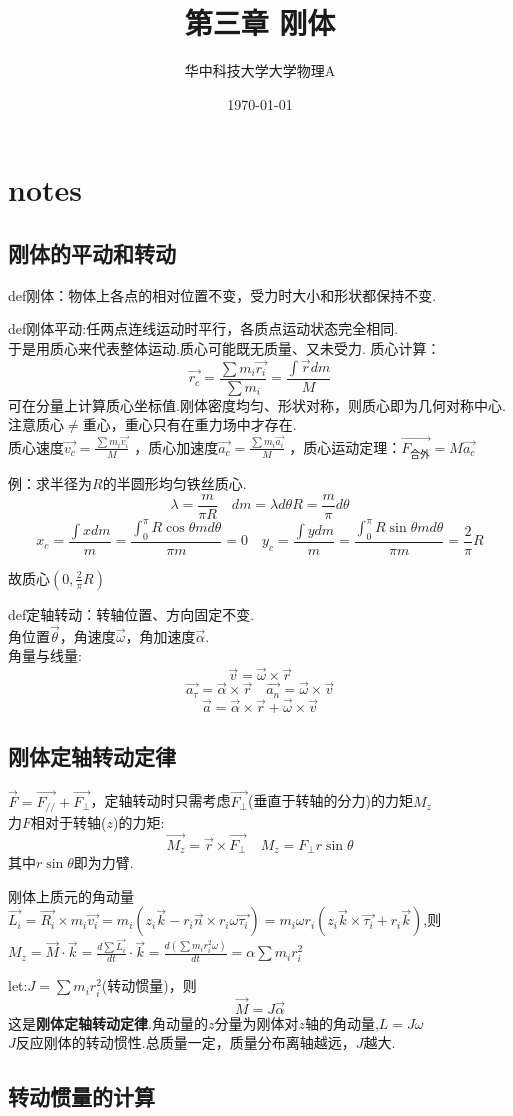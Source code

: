\documentclass[10pt,a4paper]{article}
\title{第三章 刚体}
\author{华中科技大学大学物理A}
\date{\today}
\begin{document}
\maketitle
\section{notes}
\subsection{刚体的平动和转动}
def刚体：物体上各点的相对位置不变，受力时大小和形状都保持不变.

def刚体平动:任两点连线运动时平行，各质点运动状态完全相同.
\\于是用质心来代表整体运动.质心可能既无质量、又未受力.
质心计算：
\[
\vec{r_c}=\frac{\sum m_i\vec{r_i}}{\sum m_i}
=\frac{\int\vec{r}dm}{M}
\]
可在分量上计算质心坐标值.刚体密度均匀、形状对称，则质心即为几何对称中心.
注意质心$\neq$重心，重心只有在重力场中才存在.
\\质心速度$\vec{v_c}=\frac{\sum m_i\vec{v_i}}{M}$
，质心加速度$\vec{a_c}=\frac{\sum m_i\vec{a_i}}{M}$
，质心运动定理：$\vec{F_\text{合外}}=M\vec{a_c}$

{\fontsize{8pt}{8pt}\selectfont
例：求半径为$R$的半圆形均匀铁丝质心.
\[\lambda=\frac{m}{\pi R}\quad dm=\lambda d\theta R=\frac{m}{\pi}d\theta
\]
\[x_c=\frac{\int xdm}{m}=\frac{\int_0^\pi R\cos\theta md\theta}{\pi m}=0
\quad y_c=\frac{\int ydm}{m}=\frac{\int_0^\pi R\sin\theta md\theta}{\pi m}=\frac{2}{\pi}R\]

故质心$(0,\frac{2}{\pi}R)$
}

def定轴转动：转轴位置、方向固定不变.\\
角位置$\vec{\theta}$，角速度$\vec{\omega}$，角加速度$\vec{\alpha}$.\\
角量与线量:
\[\vec{v}=\vec{\omega}\times\vec{r}\]
\[\boxed{\vec{a_{\tau}}=\vec{\alpha}\times\vec{r}}\quad\vec{a_n}=\vec{\omega}\times\vec{v}\]
\[\vec{a}=\vec{\alpha}\times\vec{r}+\vec{\omega}\times\vec{v}\]
\subsection{刚体定轴转动定律}
$\vec{F}=\vec{F_{//}}+\vec{F_\perp}$，定轴转动时只需考虑$\vec{F_{\perp}}$(垂直于转轴的分力)的力矩$M_z$
\\力$F$相对于转轴($z$)的力矩:
\[\vec{M_z}=\vec{r}\times\vec{F_\perp}\quad M_z=F_\perp r\sin\theta\]
其中$r\sin\theta$即为力臂.

{
\fontsize{8pt}{8pt}\selectfont
刚体上质元的角动量$\vec{L_i}=\vec{R_i}\times m_i\vec{v_i}=m_i(z_i\vec{k}-r_i\vec{n}\times r_i\omega\vec{\tau_i})
=m_i\omega r_i(z_i\vec{k}\times \vec{\tau_i}+r_i\vec{k})$,则
$M_z=\vec{M}\cdot\vec{k}=\frac{d\sum \vec{L_i}}{dt}\cdot\vec{k}=\frac{d(\sum m_ir_i^2\omega)}{dt}=\alpha\sum m_ir_i^2$
}

let:$J=\sum m_ir_i^2$(转动惯量)，则
\[\boxed{\vec{M}=J\vec{\alpha}}\]这是\textbf{刚体定轴转动定律}.角动量的$z$分量为刚体对$z$轴的角动量,$\boxed{L=J\omega}$
\\$J$反应刚体的转动惯性.总质量一定，质量分布离轴越远，$J$越大.
\subsection{转动惯量的计算}
\end{document}
